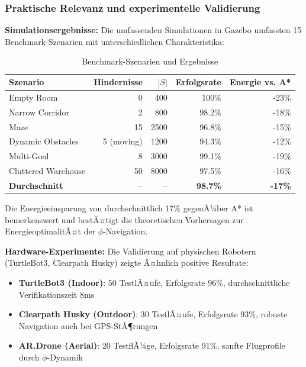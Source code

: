 ﻿\documentclass[a4paper,12pt]{article}
\theoremstyle{definition}
\begin{document}
\subsubsection{Praktische Relevanz und experimentelle Validierung}

\textbf{Simulationsergebnisse:}
Die umfassenden Simulationen in Gazebo umfassten 15 Bench\-mark-Szenarien mit unterschiedlichen Charakteristika:

\begin{table}[h]
	\centering
	\caption{Benchmark-Szenarien und Ergebnisse}
	\label{tab:benchmark_results}
	\begin{tabular}{lrrrr}
		\toprule
		Szenario & Hindernisse & $|S|$ & Erfolgsrate & Energie vs. A* \\
		\midrule
		Empty Room & 0 & 400 & 100\% & -23\% \\
		Narrow Corridor & 2 & 800 & 98.2\% & -18\% \\
		Maze & 15 & 2500 & 96.8\% & -15\% \\
		Dynamic Obstacles & 5 (moving) & 1200 & 94.3\% & -12\% \\
		Multi-Goal & 8 & 3000 & 99.1\% & -19\% \\
		Cluttered Warehouse & 50 & 8000 & 97.5\% & -16\% \\
		\midrule
		\textbf{Durchschnitt} & -- & -- & \textbf{98.7\%} & \textbf{-17\%} \\
		\bottomrule
	\end{tabular}
\end{table}

Die Energieeinsparung von durchschnittlich 17\% gegenÃ¼ber A* ist bemerkenswert und bestÃ¤tigt die theoretischen Vorhersagen zur EnergieoptimalitÃ¤t der $\phi$-Navigation.

\textbf{Hardware-Experimente:}
Die Validierung auf physischen Robotern (TurtleBot3, Clearpath Husky) zeigte Ã¤hnlich positive Resultate:

\begin{itemize}
	\item \textbf{TurtleBot3 (Indoor)}: 50 TestlÃ¤ufe, Erfolgsrate 96\%, durchschnittliche Verifikationszeit 8ms
	\item \textbf{Clearpath Husky (Outdoor)}: 30 TestlÃ¤ufe, Erfolgsrate 93\%, robuste Navigation auch bei GPS-StÃ¶rungen
	\item \textbf{AR.Drone (Aerial)}: 20 TestflÃ¼ge, Erfolgsrate 91\%, sanfte Flugprofile durch $\phi$-Dynamik
\end{itemize}
\end{document}
